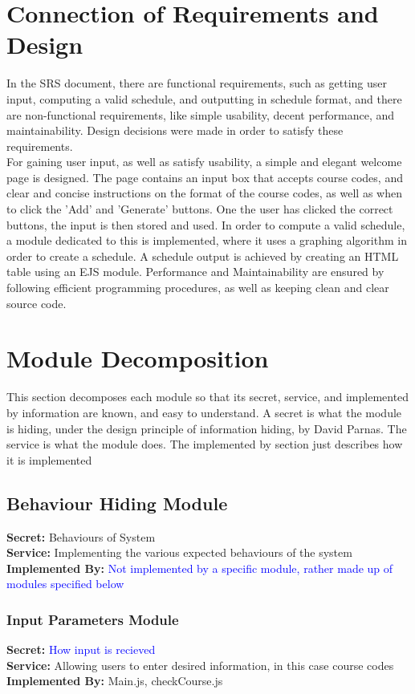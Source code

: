 \documentclass[11pt, oneside]{article}
\begin{document}
\section{Connection of Requirements and Design}
\tab In the SRS document, there are functional requirements, such as getting user input, computing a valid schedule, and outputting in schedule format, and there are non-functional requirements, like simple usability, decent performance, and maintainability. Design decisions were made in order to satisfy these requirements. \\
\tab For gaining user input, as well as satisfy usability, a simple and elegant welcome page is designed. The page contains an input box that accepts course codes, and clear and concise instructions on the format of the course codes, as well as when to click the 'Add' and 'Generate' buttons. One the user has clicked the correct buttons, the input is then stored and used. In order to compute a valid schedule, a module dedicated to this is implemented, where it uses a graphing algorithm in order to create a schedule. A schedule output is achieved by creating an HTML table using an EJS module. Performance and Maintainability are ensured by following efficient programming procedures, as well as keeping clean and clear source code.

\newpage
\section{Module Decomposition}
\tab This section decomposes each module so that its secret, service, and implemented by information are known, and easy to understand. A secret is what the module is hiding, under the design principle of information hiding, by David Parnas. \cite{1} The service is what the module does. The implemented by section just describes how it is implemented
	
\subsection{Behaviour Hiding Module}
\textbf{Secret:} Behaviours of System \\
\textbf{Service:} Implementing the various expected behaviours of the system \\
\textbf{Implemented By:}   \textcolor{blue}{Not implemented by a specific module, rather made up of modules specified below}\\

\subsubsection{Input Parameters Module}
\textbf{Secret:} \textcolor{blue}{How input is recieved}\\
\textbf{Service:} Allowing users to enter desired information, in this case course codes \\
\textbf{Implemented By:}  Main.js, checkCourse.js \\
\end{document}
